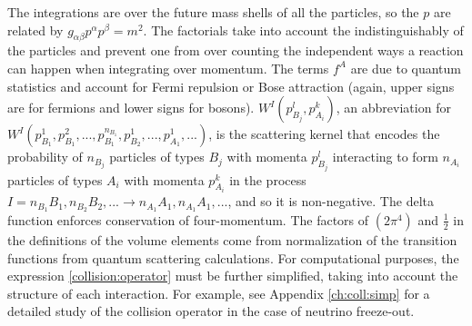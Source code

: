   The integrations are over the future mass shells of all the particles, so the $p$ are related by $g_{\alpha \beta}p^\alpha p^\beta=m^2$. The factorials take into account the indistinguishably of the particles and prevent one from over counting the independent ways a reaction can happen when integrating over momentum.  The terms $f^A$ are due to quantum statistics and account for Fermi repulsion or Bose attraction (again, upper signs are for fermions and lower signs for bosons).  $W^I(p_{B_j}^l,p_{A_i}^k)$, an abbreviation for  $W^I(p_{B_1}^1,p_{B_1}^2,...,p_{B_1}^{n_{B_1}},p_{B_2}^1,...,p_{A_1}^1,...)$, is the scattering kernel that encodes the probability of $n_{B_j}$ particles of types $B_j$ with momenta $p_{B_j}^l$ interacting to form $n_{A_i}$ particles of types $A_i$ with momenta $p_{A_i}^k$ in the process $I=n_{B_1}B_1,n_{B_2}B_2,...\longrightarrow n_{A_1}A_1,n_{A_1}A_1,...$, and so it is non-negative.  The delta function enforces conservation of four-momentum. The factors of $(2\pi^4)$ and $\frac{1}{2}$ in the definitions of the volume elements come from normalization of the transition functions from quantum scattering calculations.  For computational purposes, the expression \eqref{collision:operator} must be further simplified, taking into account the structure of each interaction.  For example, see Appendix \ref{ch:coll:simp} for a detailed study of the collision operator in the case of neutrino freeze-out.

